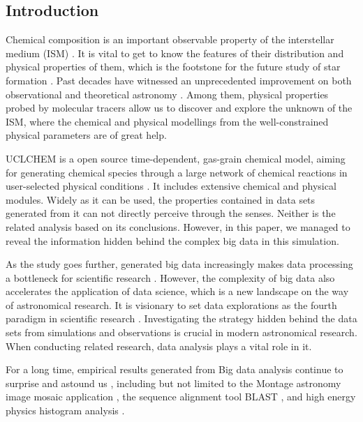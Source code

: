 \documentclass{aa}
\begin{document}
\begin{CJK*}{UTF8}{gbsn}
\section{Introduction}

    Chemical composition is an important observable property of the interstellar medium (ISM) \citep{hollenbach1997dense}. It is vital to get to know the features of their distribution and physical properties of them, which is the footstone for the future study of star formation \citep{huang2017alma}. Past decades have witnessed an unprecedented improvement on both observational \citep{des2002remote,harada2019performance,meier2015alma} and theoretical astronomy \citep{subbotin1968introduction,padmanabhan2002theoretical}. Among them, physical properties probed by molecular tracers \citep{wu2005connecting} allow us to discover and explore the unknown of the ISM, where the chemical and physical modellings from the well-constrained physical parameters are of great help.

    UCLCHEM is a open source time-dependent, gas-grain chemical model, aiming for generating chemical species through a large network of chemical reactions in user-selected physical conditions \citep{holdship2017uclchem, UCLCHEM}. It includes extensive chemical and physical modules. Widely as it can be used, the properties contained in data sets generated from it can not directly perceive through the senses. Neither is the related analysis based on its conclusions. However, in this paper, we managed to reveal the information hidden behind the complex big data in this simulation. 
   
    As the study goes further, generated big data increasingly makes data processing a bottleneck for scientific research \citep{zhang2015scientific}. 
    However, the complexity of big data also accelerates the application of data science, which is a new landscape on the way of astronomical research. It is visionary to set data explorations as the fourth paradigm in scientific research \citep{gray2005scientific}. Investigating the strategy hidden behind the data sets from simulations and observations is crucial in modern astronomical research. When conducting related research, data analysis plays a vital role in it.
    
    For a long time, empirical results generated from Big data analysis continue to surprise and astound us \citep{feigelson2012big}, including but not limited to the Montage astronomy image mosaic application \citep{jacob2010montage}, the sequence alignment tool BLAST \citep{altschul1990basic}, and high energy physics histogram analysis \citep{ekanayake2008mapreduce}. 
    

\end{CJK*}
\end{document}
